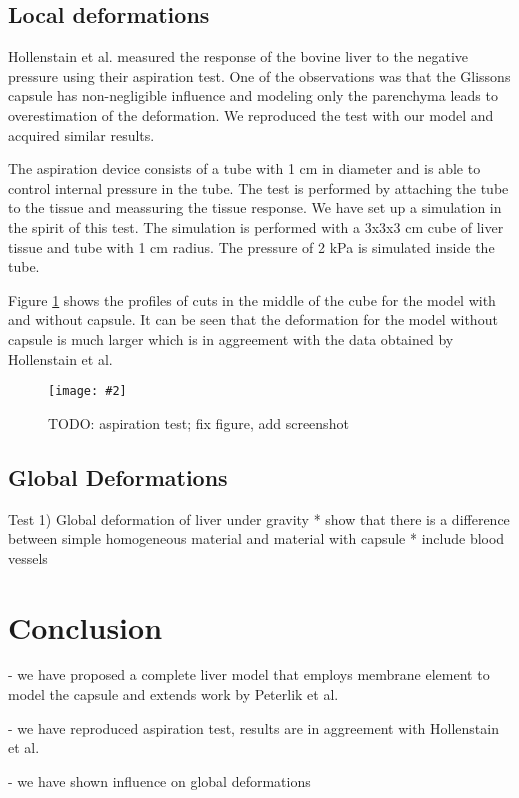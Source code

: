\documentclass{llncs}
\newcommand{\Figure}[3]{%
\begin{figure}[htb]
  \centering
  \texttt{[image: \#2]}
  \caption{\label{fig-#2}#3}
\end{figure}}
\begin{document}
\subsection{Local deformations}

Hollenstain et al. \cite{Hollenstein2006} measured the response of the
bovine liver to the negative pressure using their aspiration test. One of
the observations was that the Glissons capsule has non-negligible influence
and modeling only the parenchyma leads to overestimation of the
deformation. We reproduced the test with our model and acquired similar
results.

The aspiration device consists of a tube with 1 cm in diameter and is able
to control internal pressure in the tube. The test is performed by
attaching the tube to the tissue and meassuring the tissue response. We
have set up a simulation in the spirit of this test. 
The simulation is performed with a 3x3x3 cm cube of liver tissue and tube
with 1 cm radius. The pressure of 2 kPa is simulated inside the tube.

Figure \ref{fig-aspiration} shows the profiles of cuts in the middle of the
cube for the model with and without capsule. It can be seen that the
deformation for the model without capsule is much larger which is in
aggreement with the data obtained by Hollenstain et al.

\Figure{4in}{aspiration}{TODO: aspiration test; fix figure, add screenshot}

\subsection{Global Deformations}

Test 1) Global deformation of liver under gravity
  * show that there is a difference between simple homogeneous material
    and material with capsule
  * include blood vessels


\section{Conclusion}

- we have proposed a complete liver model that employs membrane element to model
the capsule and extends work by Peterlik et al.

- we have reproduced aspiration test, results are in aggreement with Hollenstain
  et al.

- we have shown influence on global deformations


%
%



\end{document}

